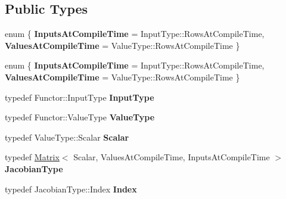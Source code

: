 \subsection*{Public Types}
\begin{DoxyCompactItemize}
\item 
\mbox{\label{class_eigen_1_1_auto_diff_jacobian_a45c4e284a49f85596263a46d3b01f961}} 
enum \{ {\bfseries Inputs\+At\+Compile\+Time} = Input\+Type\+:\+:Rows\+At\+Compile\+Time, 
{\bfseries Values\+At\+Compile\+Time} = Value\+Type\+:\+:Rows\+At\+Compile\+Time
 \}
\item 
\mbox{\label{class_eigen_1_1_auto_diff_jacobian_a205a80d09164029610a4ce99de62cddd}} 
enum \{ {\bfseries Inputs\+At\+Compile\+Time} = Input\+Type\+:\+:Rows\+At\+Compile\+Time, 
{\bfseries Values\+At\+Compile\+Time} = Value\+Type\+:\+:Rows\+At\+Compile\+Time
 \}
\item 
\mbox{\label{class_eigen_1_1_auto_diff_jacobian_a25e2937641e16ba80edcf48a12b16b9c}} 
typedef Functor\+::\+Input\+Type {\bfseries Input\+Type}
\item 
\mbox{\label{class_eigen_1_1_auto_diff_jacobian_a6a4ed984810a6561e7f89e885ceeb6aa}} 
typedef Functor\+::\+Value\+Type {\bfseries Value\+Type}
\item 
\mbox{\label{class_eigen_1_1_auto_diff_jacobian_a5d223badd23a9e5985965eff26a2fa6b}} 
typedef Value\+Type\+::\+Scalar {\bfseries Scalar}
\item 
\mbox{\label{class_eigen_1_1_auto_diff_jacobian_acd5c9daf8db336d70ad61cc75e62af22}} 
typedef \hyperlink{group___core___module_class_eigen_1_1_matrix}{Matrix}$<$ Scalar, Values\+At\+Compile\+Time, Inputs\+At\+Compile\+Time $>$ {\bfseries Jacobian\+Type}
\item 
\mbox{\label{class_eigen_1_1_auto_diff_jacobian_ae6a173d8a90810c34fe9aceb4e5c04a1}} 
typedef Jacobian\+Type\+::\+Index {\bfseries Index}
\item 
\mbox{\label{class_eigen_1_1_auto_diff_jacobian_aa1655a735186d0a04c3cfd8d36b7e4af}} 

\end{DoxyCompactItemize}
